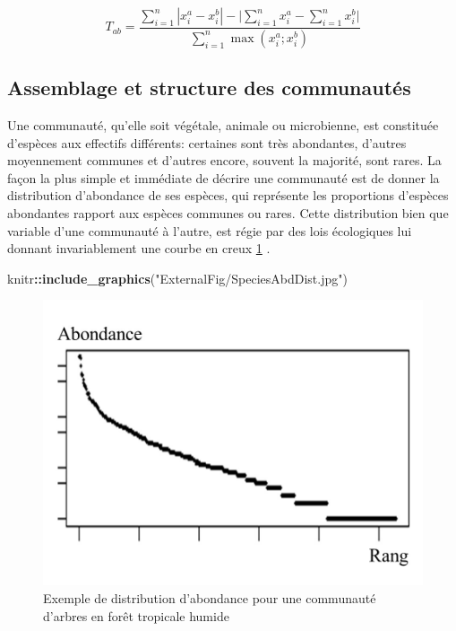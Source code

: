 \documentclass[
  11pt,
  french,
  A4paper,
  extrafontsizes,onecolumn,openright
  ]{memoir}
\newenvironment{Shaded}{\begin{snugshade}}{\end{snugshade}}
\newcommand{\KeywordTok}[1]{\textcolor[rgb]{0.13,0.29,0.53}{\textbf{#1}}}
\newcommand{\StringTok}[1]{\textcolor[rgb]{0.31,0.60,0.02}{#1}}
\newcommand{\OperatorTok}[1]{\textcolor[rgb]{0.81,0.36,0.00}{\textbf{#1}}}
\newcommand{\NormalTok}[1]{#1}
\begin{document}
\begin{equation}
T_{ab}=\frac{\sum_{i=1}^{n}|x_i^a - x_i^b| - \bigg| \sum_{i=1}^{n}{x_i^a} - \sum_{i=1}^{n}{x_i^b} \bigg|}{\sum_{i=1}^{n}\max{\left( x_i^a;x_i^b \right)}}
\label{eq:formNestedness}
\end{equation}

\subsection{Assemblage et structure des
communautés}\label{AbundanceDistribution}

Une communauté, qu'elle soit végétale, animale ou microbienne, est
constituée d'espèces aux effectifs différents: certaines sont très
abondantes, d'autres moyennement communes et d'autres encore, souvent la
majorité, sont rares. La façon la plus simple et immédiate de décrire
une communauté est de donner la distribution d'abondance de ses espèces,
qui représente les proportions d'espèces abondantes rapport aux espèces
communes ou rares. Cette distribution bien que variable d'une communauté
à l'autre, est régie par des lois écologiques lui donnant invariablement
une courbe en creux \ref{fig:AbdDist} \autocite{McGill2007}.

\begin{Shaded}
\begin{Highlighting}[]
\NormalTok{knitr}\OperatorTok{::}\KeywordTok{include_graphics}\NormalTok{(}\StringTok{"ExternalFig/SpeciesAbdDist.jpg"}\NormalTok{)}
\end{Highlighting}
\end{Shaded}

\begin{figure}

{\centering \includegraphics[width=0.6\linewidth]{ExternalFig/SpeciesAbdDist} 

}

\caption{Exemple de distribution d'abondance pour une communauté d'arbres en forêt tropicale humide}\label{fig:AbdDist}
\end{figure}
\end{document}
